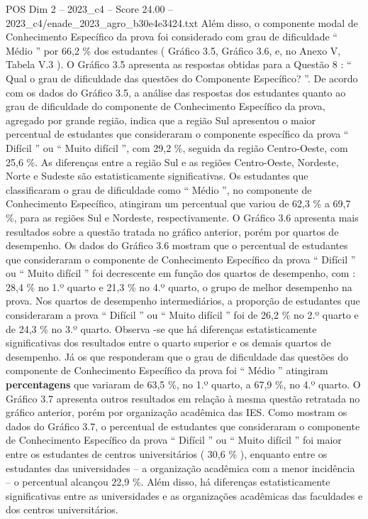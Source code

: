 \begin{textsample}{POS Dim 2 – 2023\_c4 – Score 24.00 – 2023\_c4/enade\_2023\_agro\_b30e4e3424.txt}
Além disso, o componente modal de Conhecimento Específico da prova foi considerado com grau de dificuldade “ Médio ” por 66,2 \% dos estudantes ( Gráfico 3.5, Gráfico 3.6, e, no Anexo V, Tabela V.3 ).
O Gráfico 3.5 apresenta as respostas obtidas para a Questão 8 : “ Qual o grau de dificuldade das questões do Componente Específico? ”.
De acordo com os dados do Gráfico 3.5, a análise das respostas dos estudantes quanto ao grau de dificuldade do componente de Conhecimento Específico da prova, agregado por grande região, indica que a região Sul apresentou o maior percentual de estudantes que consideraram o componente específico da prova “ Difícil ” ou “ Muito difícil ”, com 29,2 \%, seguida da região Centro-Oeste, com 25,6 \%.
As diferenças entre a região Sul e as regiões Centro-Oeste, Nordeste, Norte e Sudeste são estatisticamente significativas.
Os estudantes que classificaram o grau de dificuldade como “ Médio ”, no componente de Conhecimento Específico, atingiram um percentual que variou de 62,3 \% a 69,7 \%, para as regiões Sul e Nordeste, respectivamente.
O Gráfico 3.6 apresenta mais resultados sobre a questão tratada no gráfico anterior, porém por quartos de desempenho.
Os dados do Gráfico 3.6 mostram que o percentual de estudantes que consideraram o componente de Conhecimento Específico da prova “ Difícil ” ou “ Muito difícil ” foi decrescente em função dos quartos de desempenho, com : 28,4 \% no 1.º quarto e 21,3 \% no 4.º quarto, o grupo de melhor desempenho na prova.
Nos quartos de desempenho intermediários, a proporção de estudantes que consideraram a prova “ Difícil ” ou “ Muito difícil ” foi de 26,2 \% no 2.º quarto e de 24,3 \% no 3.º quarto.
Observa -se que há diferenças estatisticamente significativas dos resultados entre o quarto superior e os demais quartos de desempenho.
Já os que responderam que o grau de dificuldade das questões do componente de Conhecimento Específico da prova foi “ Médio ” atingiram \textbf{percentagens} que variaram de 63,5 \%, no 1.º quarto, a 67,9 \%, no 4.º quarto.
O Gráfico 3.7 apresenta outros resultados em relação à mesma questão retratada no gráfico anterior, porém por organização acadêmica das IES.
Como mostram os dados do Gráfico 3.7, o percentual de estudantes que consideraram o componente de Conhecimento Específico da prova “ Difícil ” ou “ Muito difícil ” foi maior entre os estudantes de centros universitários ( 30,6 \% ), enquanto entre os estudantes das universidades – a organização acadêmica com a menor incidência – o percentual alcançou 22,9 \%.
Além disso, há diferenças estatisticamente significativas entre as universidades e as organizações acadêmicas das faculdades e dos centros universitários.

\end{textsample}
